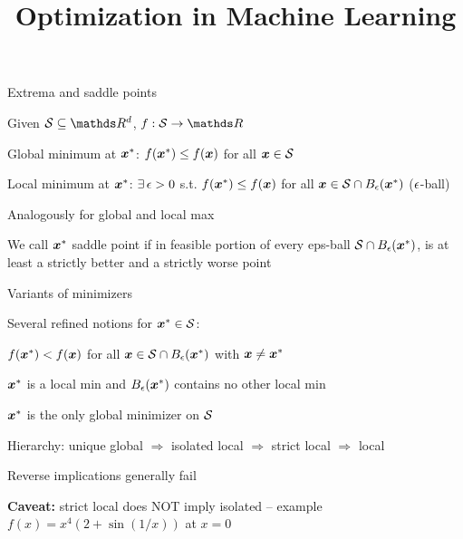 \documentclass[11pt,compress,t,notes=noshow, xcolor=table]{beamer}
\title{Optimization in Machine Learning}
\begin{document}

\begin{framei}{Extrema and saddle points}
\item Given $\S \subseteq \R^d$, $f: \S \to \R$
\item Global minimum at $\xvs$: $\fxvs \le \fx$ for all $\xv \in \S$
\item Local minimum at $\xvs$: $\exists\, \eps > 0$ s.t. $\fxvs \le \fx$ for all $\xv \in \S \cap B_\eps(\xvs)$ ($\eps$-ball)
\item Analogously for global and local max
\item We call $\xvs$ saddle point if in feasible portion of every eps-ball
$\S \cap B_\eps(\xvs)$, is at least a strictly better and a strictly worse point
\vfill
{}
\end{framei}

\begin{framei}{Variants of minimizers}
\item Several refined notions for $\xvs \in \S$:
\item[\textbf{Strict local min:}] $\fxvs < \fx$ for all $\xv \in \S \cap B_\eps(\xvs)$ with $\xv \neq \xvs$
\item[\textbf{Isolated local min:}] $\xvs$ is a local min and $B_\eps(\xvs)$ contains no other local min
\item[\textbf{Unique global min:}] $\xvs$ is the only global minimizer on $\S$
\spacer
\item Hierarchy: unique global $\Rightarrow$ isolated local $\Rightarrow$ strict local $\Rightarrow$ local
\item Reverse implications generally fail
\item \textbf{Caveat:} strict local does NOT imply isolated -- example $f(x) = x^4 (2 + \sin(1/x))$ at $x=0$
\end{framei}
\end{document}
